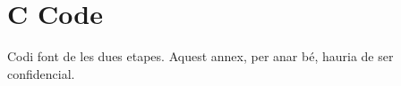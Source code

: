 \chapter{C Code}
Codi font de les dues etapes. Aquest annex, per anar bé, hauria de ser confidencial.